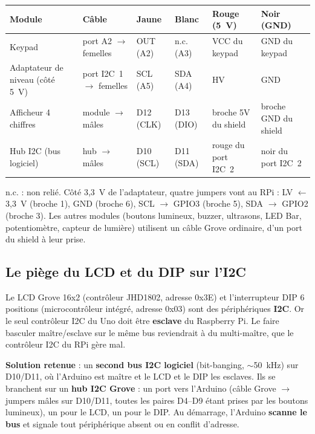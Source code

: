 \documentclass[11pt,a4paper]{article}
\newcommand{\env}{\mbox{$\sim$}}
\begin{document}
\begin{center}\small
\begin{tabularx}{\linewidth}{P{2.7cm}P{2.6cm}P{1.8cm}P{1.8cm}LL}
\toprule
\textbf{Module} & \textbf{Câble} & \textbf{Jaune} & \textbf{Blanc} & \textbf{Rouge (5~V)} & \textbf{Noir (GND)} \\
\midrule
Keypad & port A2 $\to$ femelles & OUT (A2) & n.c. (A3) & VCC du keypad & GND du keypad \\
Adaptateur de niveau (côté 5~V) & port I2C~1 $\to$ femelles & SCL (A5) & SDA (A4) & HV & GND \\
Afficheur 4 chiffres & module $\to$ mâles & D12 (CLK) & D13 (DIO) & broche 5V du shield & broche GND du shield \\
Hub I2C (bus logiciel) & hub $\to$ mâles & D10 (SCL) & D11 (SDA) & rouge du port I2C~2 & noir du port I2C~2 \\
\bottomrule
\end{tabularx}
\end{center}

n.c. : non relié. Côté 3,3~V de l'adaptateur, quatre jumpers vont au RPi : LV $\leftarrow$ 3,3~V (broche 1), GND (broche 6), SCL $\to$ GPIO3 (broche 5), SDA $\to$ GPIO2 (broche 3). Les autres modules (boutons lumineux, buzzer, ultrasons, LED Bar, potentiomètre, capteur de lumière) utilisent un câble Grove ordinaire, d'un port du shield à leur prise.

\subsection{Le piège du LCD et du DIP sur l'I2C}
\label{sec:i2clog}

Le LCD Grove 16x2 (contrôleur JHD1802, adresse 0x3E) et l'interrupteur DIP 6 positions (microcontrôleur intégré, adresse 0x03) sont des périphériques \textbf{I2C}. Or le seul contrôleur I2C du Uno doit être \textbf{esclave} du Raspberry Pi. Le faire basculer maître/esclave sur le même bus reviendrait à du multi-maître, que le contrôleur I2C du RPi gère mal.

\textbf{Solution retenue} : un \textbf{second bus I2C logiciel} (bit-banging, \env 50~kHz) sur D10/D11, où l'Arduino est maître et le LCD et le DIP les esclaves. Ils se branchent sur un \textbf{hub I2C Grove} : un port vers l'Arduino (câble Grove $\to$ jumpers mâles sur D10/D11, toutes les paires D4--D9 étant prises par les boutons lumineux), un pour le LCD, un pour le DIP. Au démarrage, l'Arduino \textbf{scanne le bus} et signale tout périphérique absent ou en conflit d'adresse.
\end{document}
